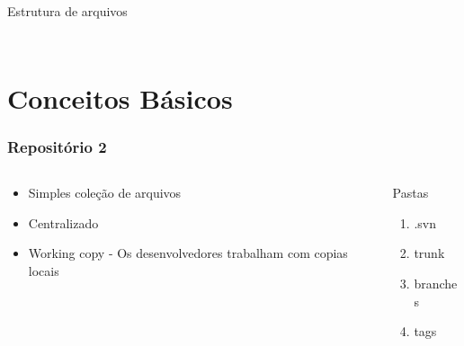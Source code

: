 \documentclass{beamer}
\begin{document}
\begin{frame}
\begin{columns}
\begin{column}{.5\textwidth}
\begin{block}{Estrutura de arquivos}
\begin{columns}
\begin{column}{.5\textwidth}
\begin{figure}
                        \end{figure}
                    \end{column}
                \end{columns}
            \end{block}
        \end{column}
    \end{columns}
\end{frame}


\section{Conceitos B\'asicos}

\begin{frame}
    \frametitle{Reposit\'orio 2}

    \begin{columns}
        \begin{column}{.5\textwidth}
            \begin{itemize}
                \item Simples cole\c{c}\~ao de arquivos
                \item Centralizado
                \item Working copy - Os desenvolvedores trabalham com copias locais
            \end{itemize}
        \end{column}
        \begin{column}{.5\textwidth}
            \begin{block}{Pastas}
                \begin{enumerate}
                    \item .svn
                    \item trunk
                    \item branches
                    \item tags
                \end{enumerate}
            \end{block}
        \end{column}
    \end{columns}
\end{frame}
\end{document}
